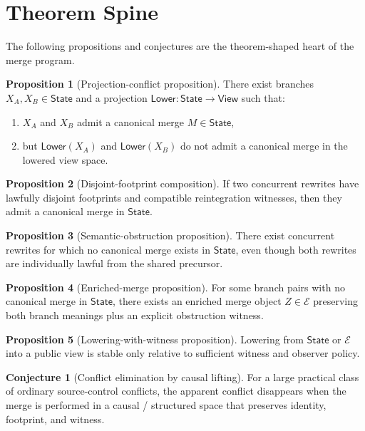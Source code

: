 \documentclass[11pt]{article}
\newcommand{\State}{\ensuremath{\mathsf{State}}}
\newcommand{\View}{\ensuremath{\mathsf{View}}}
\newcommand{\Lower}{\ensuremath{\mathsf{Lower}}}
\newcommand{\Enriched}{\ensuremath{\mathcal{E}}}
\theoremstyle{definition}
\newtheorem{proposition}{Proposition}
\newtheorem{conjecture}{Conjecture}
\begin{document}
\section{Theorem Spine}

The following propositions and conjectures are the theorem-shaped heart of the
merge program.

\begin{proposition}[Projection-conflict proposition]
There exist branches $X_A, X_B \in \State$ and a projection
$\Lower : \State \to \View$ such that:
\begin{enumerate}[leftmargin=2em]
\item $X_A$ and $X_B$ admit a canonical merge $M \in \State$,
\item but $\Lower(X_A)$ and $\Lower(X_B)$ do not admit a canonical merge in
  the lowered view space.
\end{enumerate}
\end{proposition}

\begin{proposition}[Disjoint-footprint composition]
If two concurrent rewrites have lawfully disjoint footprints and compatible
reintegration witnesses, then they admit a canonical merge in $\State$.
\end{proposition}

\begin{proposition}[Semantic-obstruction proposition]
There exist concurrent rewrites for which no canonical merge exists in
$\State$, even though both rewrites are individually lawful from the shared
precursor.
\end{proposition}

\begin{proposition}[Enriched-merge proposition]
For some branch pairs with no canonical merge in $\State$, there exists an
enriched merge object $Z \in \Enriched$ preserving both branch meanings plus an
explicit obstruction witness.
\end{proposition}

\begin{proposition}[Lowering-with-witness proposition]
Lowering from $\State$ or $\Enriched$ into a public view is stable only
relative to sufficient witness and observer policy.
\end{proposition}

\begin{conjecture}[Conflict elimination by causal lifting]
For a large practical class of ordinary source-control conflicts, the apparent
conflict disappears when the merge is performed in a causal / structured space
that preserves identity, footprint, and witness.
\end{conjecture}
\end{document}
